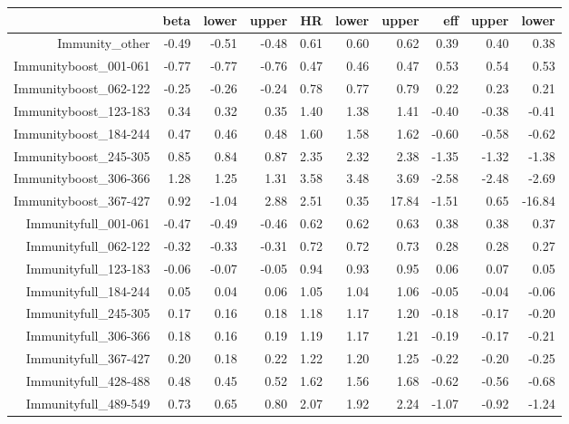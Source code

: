 \begin{table}[ht]
\centering
\begin{tabular}{rrrrrrrrrr}
  \hline
 & beta & lower & upper & HR & lower & upper & eff & upper & lower \\ 
  \hline
Immunity\_other & -0.49 & -0.51 & -0.48 & 0.61 & 0.60 & 0.62 & 0.39 & 0.40 & 0.38 \\ 
  Immunityboost\_001-061 & -0.77 & -0.77 & -0.76 & 0.47 & 0.46 & 0.47 & 0.53 & 0.54 & 0.53 \\ 
  Immunityboost\_062-122 & -0.25 & -0.26 & -0.24 & 0.78 & 0.77 & 0.79 & 0.22 & 0.23 & 0.21 \\ 
  Immunityboost\_123-183 & 0.34 & 0.32 & 0.35 & 1.40 & 1.38 & 1.41 & -0.40 & -0.38 & -0.41 \\ 
  Immunityboost\_184-244 & 0.47 & 0.46 & 0.48 & 1.60 & 1.58 & 1.62 & -0.60 & -0.58 & -0.62 \\ 
  Immunityboost\_245-305 & 0.85 & 0.84 & 0.87 & 2.35 & 2.32 & 2.38 & -1.35 & -1.32 & -1.38 \\ 
  Immunityboost\_306-366 & 1.28 & 1.25 & 1.31 & 3.58 & 3.48 & 3.69 & -2.58 & -2.48 & -2.69 \\ 
  Immunityboost\_367-427 & 0.92 & -1.04 & 2.88 & 2.51 & 0.35 & 17.84 & -1.51 & 0.65 & -16.84 \\ 
  Immunityfull\_001-061 & -0.47 & -0.49 & -0.46 & 0.62 & 0.62 & 0.63 & 0.38 & 0.38 & 0.37 \\ 
  Immunityfull\_062-122 & -0.32 & -0.33 & -0.31 & 0.72 & 0.72 & 0.73 & 0.28 & 0.28 & 0.27 \\ 
  Immunityfull\_123-183 & -0.06 & -0.07 & -0.05 & 0.94 & 0.93 & 0.95 & 0.06 & 0.07 & 0.05 \\ 
  Immunityfull\_184-244 & 0.05 & 0.04 & 0.06 & 1.05 & 1.04 & 1.06 & -0.05 & -0.04 & -0.06 \\ 
  Immunityfull\_245-305 & 0.17 & 0.16 & 0.18 & 1.18 & 1.17 & 1.20 & -0.18 & -0.17 & -0.20 \\ 
  Immunityfull\_306-366 & 0.18 & 0.16 & 0.19 & 1.19 & 1.17 & 1.21 & -0.19 & -0.17 & -0.21 \\ 
  Immunityfull\_367-427 & 0.20 & 0.18 & 0.22 & 1.22 & 1.20 & 1.25 & -0.22 & -0.20 & -0.25 \\ 
  Immunityfull\_428-488 & 0.48 & 0.45 & 0.52 & 1.62 & 1.56 & 1.68 & -0.62 & -0.56 & -0.68 \\ 
  Immunityfull\_489-549 & 0.73 & 0.65 & 0.80 & 2.07 & 1.92 & 2.24 & -1.07 & -0.92 & -1.24 \\ 

\end{tabular}
\end{table}
